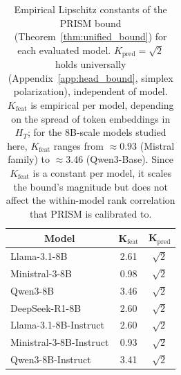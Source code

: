 \begin{table}[t]
\centering
\caption{Empirical Lipschitz constants of the PRISM bound (Theorem~\ref{thm:unified_bound}) for each evaluated model. $K_{\mathrm{pred}} = \sqrt{2}$ holds universally (Appendix~\ref{app:head_bound}, simplex polarization), independent of model. $K_{\mathrm{feat}}$ is empirical per model, depending on the spread of token embeddings in $H_T$; for the 8B-scale models studied here, $K_{\mathrm{feat}}$ ranges from $\approx 0.93$ (Mistral family) to $\approx 3.46$ (Qwen3-Base). Since $K_{\mathrm{feat}}$ is a constant per model, it scales the bound's magnitude but does not affect the within-model rank correlation that PRISM is calibrated to.}
\label{tab:lipschitz_constants}
\setlength{\tabcolsep}{8pt}
\begin{tabular}{l cc}
\toprule
\multicolumn{1}{c}{\textbf{Model}} & \multicolumn{1}{c}{$\boldsymbol{K_{\mathrm{feat}}}$} & \multicolumn{1}{c}{$\boldsymbol{K_{\mathrm{pred}}}$} \\
\midrule
Llama-3.1-8B & 2.61 & $\sqrt{2}$ \\
Ministral-3-8B & 0.98 & $\sqrt{2}$ \\
Qwen3-8B & 3.46 & $\sqrt{2}$ \\
DeepSeek-R1-8B & 2.60 & $\sqrt{2}$ \\
Llama-3.1-8B-Instruct & 2.60 & $\sqrt{2}$ \\
Ministral-3-8B-Instruct & 0.93 & $\sqrt{2}$ \\
Qwen3-8B-Instruct & 3.41 & $\sqrt{2}$ \\
\bottomrule
\end{tabular}
\end{table}